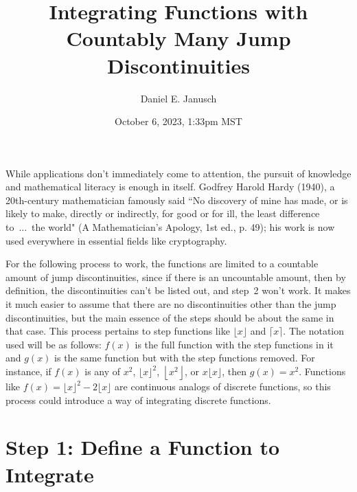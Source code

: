 \documentclass[12pt]{article}
\begin{document}
\title{Integrating Functions with Countably Many Jump Discontinuities}
\author{Daniel E. Janusch}
\date{October 6, 2023, 1:33pm MST}

\maketitle

	While applications don't immediately come to attention, the pursuit of knowledge and mathematical literacy
	is enough in itself. Godfrey Harold Hardy (1940), a 20th-century mathematician famously said ``No discovery
	of mine has made, or is likely to make, directly or indirectly, for good or for ill, the least difference
	to~...~the world" (A Mathematician's Apology, 1st ed., p. 49); his work is now used everywhere in essential
	fields like cryptography.

	For the following process to work, the functions are limited to a countable amount of jump discontinuities,
	since if there is an uncountable amount, then by definition, the discontinuities can't be listed out, and
	step~2 won't work. It makes it much easier to assume that there are no discontinuities other than the jump
	discontinuities, but the main essence of the steps should be about the same in that case. This process
	pertains to step functions like $\lfloor x\rfloor$ and $\lceil x\rceil$. The notation used will be as
	follows: $f(x)$ is the full function with the step functions in it and  $g(x)$ is the same function but
	with the step functions removed. For instance, if $f(x)$ is any of $x^2$, $\lfloor x\rfloor^2$,
	$\left\lfloor x^2\right\rfloor$, or $x\lfloor x\rfloor$, then $g(x)=x^2$. Functions like
	$f(x)=\lfloor x\rfloor^2-2\lfloor x\rfloor$ are continuous analogs of discrete functions, so this process
	could introduce a way of integrating discrete functions.

\section*{Step 1: Define a Function to Integrate}
\end{document}

